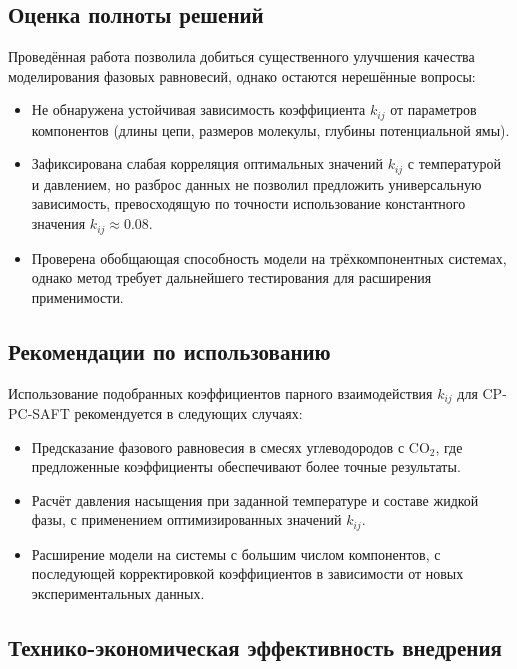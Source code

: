 \documentclass[a4paper,12pt]{article}
\begin{document}
\subsection{Оценка полноты решений}

Проведённая работа позволила добиться существенного улучшения качества моделирования фазовых равновесий, однако остаются нерешённые вопросы:

\begin{itemize}
    \item Не обнаружена устойчивая зависимость коэффициента \( k_{ij} \) от параметров компонентов (длины цепи, размеров молекулы, глубины потенциальной ямы).
    \item Зафиксирована слабая корреляция оптимальных значений \( k_{ij} \) с температурой и давлением, но разброс данных не позволил предложить универсальную зависимость, превосходящую по точности использование константного значения \( k_{ij} \approx 0.08 \).
    \item Проверена обобщающая способность модели на трёхкомпонентных системах, однако метод требует дальнейшего тестирования для расширения применимости.
\end{itemize}

\subsection{Рекомендации по использованию}

Использование подобранных коэффициентов парного взаимодействия \( k_{ij} \) для CP-PC-SAFT рекомендуется в следующих случаях:

\begin{itemize}
    \item Предсказание фазового равновесия в смесях углеводородов с $\mathrm{CO}_{2}$, где предложенные коэффициенты обеспечивают более точные результаты.
    \item Расчёт давления насыщения при заданной температуре и составе жидкой фазы, с применением оптимизированных значений \( k_{ij} \).
    \item Расширение модели на системы с большим числом компонентов, с последующей корректировкой коэффициентов в зависимости от новых экспериментальных данных.
\end{itemize}

\subsection{Технико-экономическая эффективность внедрения}
\end{document}

